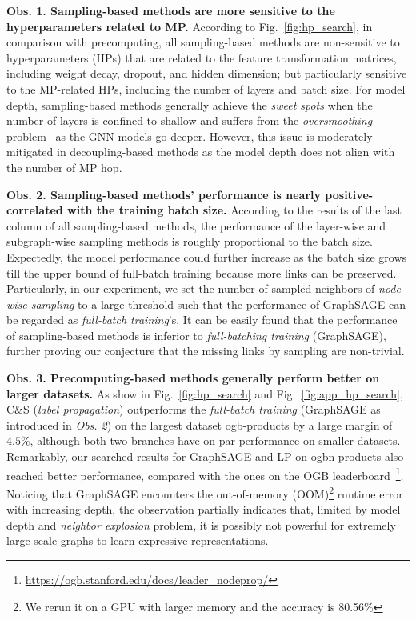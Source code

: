 \message{ !name(main.tex)}\documentclass{article}
\begin{document}
\textbf{Obs. 1. Sampling-based methods are more sensitive to the hyperparameters related to MP.} According to Fig.~\ref{fig:hp_search}, in comparison with precomputing, all sampling-based methods are non-sensitive to hyperparameters (HPs) that are related to the feature transformation matrices, including weight decay, dropout, and hidden dimension; but particularly sensitive to the MP-related HPs, including the number of layers and batch size. For model depth, sampling-based methods generally achieve the \textit{sweet spots} when the number of layers is confined to shallow and suffers from the \textit{oversmoothing} problem~\cite{li2018deeper, chen2022bag, oono2020graph, zhou2020towards, zhou2021dirichlet} as the GNN models go deeper. However, this issue is moderately mitigated in decoupling-based methods as the model depth does not align with the number of MP hop.

\textbf{Obs. 2. Sampling-based methods' performance is nearly positive-correlated with the training batch size.} According to the results of the last column of all sampling-based methods, the performance of the layer-wise and subgraph-wise sampling methods is roughly proportional to the batch size. Expectedly, the model performance could further increase as the batch size grows till the upper bound of full-batch training because more links can be preserved. Particularly, in our experiment, we set the number of sampled neighbors of \textit{node-wise sampling} to a large threshold such that the performance of GraphSAGE can be regarded as \textit{full-batch training}'s. It can be easily found that the performance of sampling-based methods is inferior to \textit{full-batching training} (GraphSAGE), further proving our conjecture that the missing links by sampling are non-trivial.

\textbf{Obs. 3. Precomputing-based methods generally perform better on larger datasets.} As show in Fig.~\ref{fig:hp_search} and Fig.~\ref{fig:app_hp_search}, C\&S (\textit{label propagation}) outperforms the \textit{full-batch training} (GraphSAGE as introduced in \textit{Obs. 2}) on the largest dataset ogb-products by a large margin of $4.5\%$, although both two branches have on-par performance on smaller datasets. Remarkably, our searched results for GraphSAGE and LP on ogbn-products also reached better performance, compared with the ones on the OGB leaderboard~\footnote{\url{https://ogb.stanford.edu/docs/leader_nodeprop/}}. Noticing that GraphSAGE encounters the out-of-memory (OOM)\footnote{We rerun it on a GPU with larger memory and the accuracy is 80.56\%} runtime error with increasing depth, the observation partially indicates that, limited by model depth and \textit{neighbor explosion} problem, it is possibly not powerful for extremely large-scale graphs to learn expressive representations.
\end{document}
